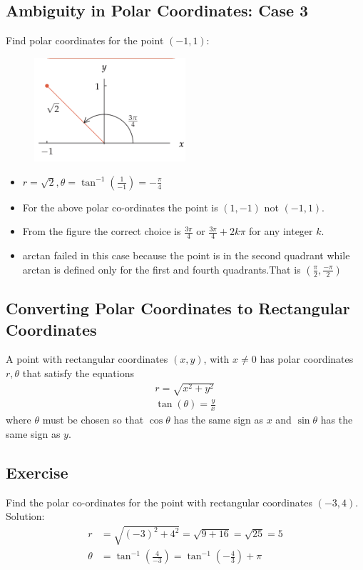\subsection{Ambiguity in Polar Coordinates: Case 3}
Find polar coordinates for the point \((-1, 1)\):
\begin{figure}
    \centering
    \includegraphics[width=0.5\textwidth]{pics/polar5.png}
\end{figure}
\begin{itemize}
    \item \(r = \sqrt{2}, \theta = \tan^{-1} \left(\frac{1}{-1}\right) = -\frac{\pi}{4}\)
    \item For the above polar co-ordinates the point is \((1,-1)\) not \((-1, 1)\).
    \item From the figure the correct choice is \(\frac{3\pi}{4}\) or \(\frac{3\pi}{4} + 2k\pi\) for any integer \( k \).
    \item arctan failed in this case because the point is in the second quadrant while arctan is defined only for the first and fourth quadrants.That is \((\frac{\pi}{2},\frac{-\pi}{2})\)
\end{itemize}

\subsection{Converting Polar Coordinates to Rectangular Coordinates}
A point with rectangular coordinates \((x, y)\), with \(x \neq 0\) has polar coordinates \(r,\theta\) that satisfy the equations
\begin{align*}
    r = \sqrt{x^2 + y^2} \\
    \tan(\theta) = \frac{y}{x}
\end{align*}
where \(\theta\) must be chosen so that \(\cos \theta \) has the same sign as \(x\) and \(\sin \theta\) has the same sign as \(y\).

\subsection{Exercise}
Find the polar co-ordinates for the point with rectangular coordinates \((-3, 4)\).
Solution:
\begin{align*}
    r &= \sqrt{(-3)^2 + 4^2} = \sqrt{9 + 16} = \sqrt{25} = 5 \\
    \theta &= \tan^{-1}\left(\frac{4}{-3}\right) = \tan^{-1}\left(-\frac{4}{3}\right) + \pi
\end{align*}

